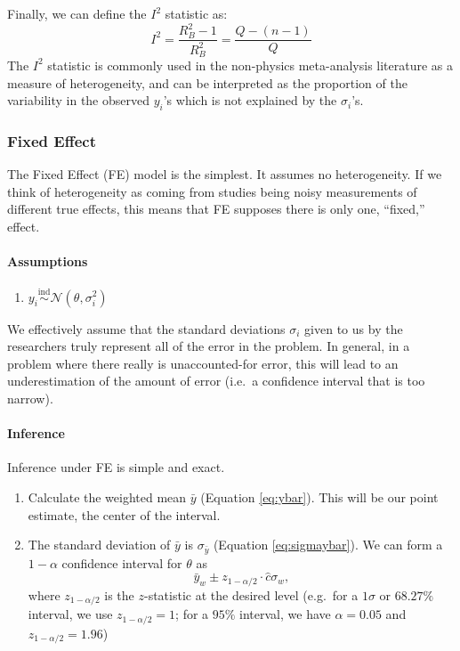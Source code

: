 \documentclass[letterpaper,12pt]{article}
\begin{document}
Finally, we can define the $I^2$ statistic as:
\[I^2=\frac{R_B^2-1}{R_B^2}=\frac{Q-(n-1)}{Q}\]
The $I^2$ statistic is commonly used in the non-physics meta-analysis literature as a measure of heterogeneity, and can be interpreted as the proportion of the variability in the observed $y_i$'s which is not explained by the $\sigma_i$'s.


\subsubsection{Fixed Effect}\label{sec:fixed-effect}

The Fixed Effect (FE) model is the simplest. It assumes no heterogeneity. If we think of heterogeneity as coming from studies being noisy measurements of different true effects, this means that FE supposes there is only one, ``fixed,'' effect.

\paragraph{Assumptions}\label{assumptions-1}

\begin{enumerate}
\item
  $y_i\overset{\mathrm{ind}}{\sim}\mathcal{N}(\theta,\sigma_i^2)$
\end{enumerate}

We effectively assume that the standard deviations $\sigma_i$ given to us by the researchers truly represent all of the error in the problem. In general, in a problem where there really is unaccounted-for error, this will lead to an underestimation of the amount of error (i.e.~a confidence interval that is too narrow).

\paragraph{Inference}\label{inference-1}

Inference under FE is simple and exact.

\begin{enumerate}
\item
  Calculate the weighted mean $\bar{y}$ (Equation \ref{eq:ybar}). This will be our point estimate, the center of the interval.
\item
  The standard deviation of $\bar{y}$ is $\sigma_{\bar y}$ (Equation \ref{eq:sigmaybar}). We can form a $1-\alpha$ confidence interval for $\theta$ as \[\bar{y}_w\pm z_{1-{\alpha/2}}\cdot \hat c\sigma_w,\] where $z_{1-\alpha/2}$ is the $z$-statistic at the desired level (e.g.~for a $1\sigma$ or $68.27\%$ interval, we use $z_{1-\alpha/2}=1$; for a $95\%$ interval, we have $\alpha=0.05$ and $z_{1-\alpha/2}=1.96$)
\end{enumerate}
\end{document}
